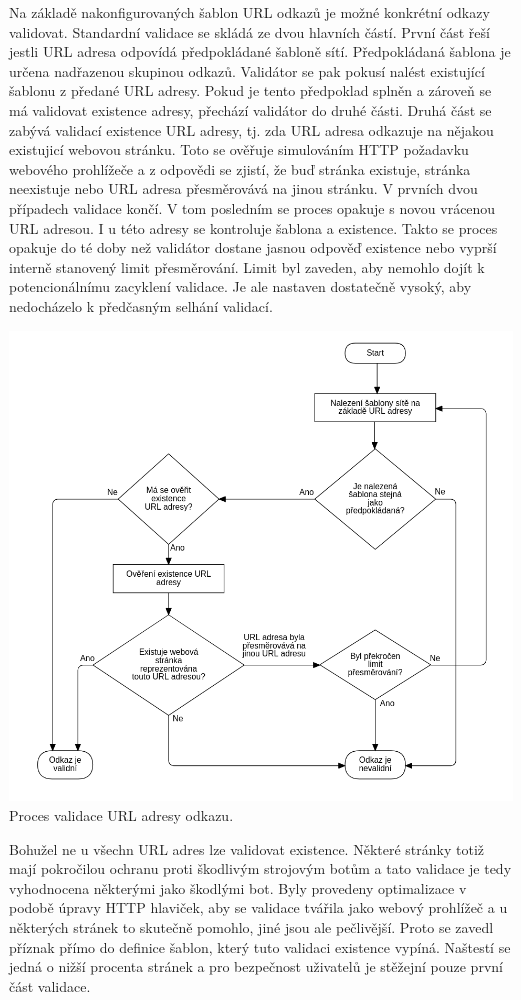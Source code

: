 \begin{itemize}
\begin{itemize}
			Na základě nakonfigurovaných šablon URL odkazů je možné konkrétní odkazy validovat.
			Standardní validace se skládá ze dvou hlavních částí.
			První část řeší jestli \ac{URL} adresa odpovídá předpokládané šabloně sítí.
			Předpokládaná šablona je určena nadřazenou skupinou odkazů.
			Validátor se pak pokusí nalést existující šablonu z předané URL adresy.
			Pokud je tento předpoklad splněn a zároveň se má validovat existence adresy, přechází validátor do druhé části.
			Druhá část se zabývá validací existence \ac{URL} adresy, tj. zda URL adresa odkazuje na nějakou existujicí
			webovou stránku.
			Toto se ověřuje simulováním \ac{HTTP} požadavku webového prohlížeče a z odpovědi se zjistí, že buď stránka
			existuje, stránka neexistuje nebo URL adresa přesměrovává na jinou stránku.
			V prvních dvou případech validace končí.
			V tom posledním se proces opakuje s novou vrácenou URL adresou.
			I u této adresy se kontroluje šablona a existence.
			Takto se proces opakuje do té doby než validátor dostane jasnou odpověď existence nebo vyprší interně stanovený
			limit přesměrování.
			Limit byl zaveden, aby nemohlo dojít k potencionálnímu zacyklení validace.
			Je ale nastaven dostatečně vysoký, aby nedocházelo k předčasným selhání validací.

			\includegraphics{obrazky/proces_validace_odkazu}\hfill
			Proces validace URL adresy odkazu. %

			Bohužel ne u všechn URL adres lze validovat existence.
			Některé stránky totiž mají pokročilou ochranu proti škodlivým strojovým botům a tato validace je tedy
			vyhodnocena některými jako škodlými bot.
			Byly provedeny optimalizace v podobě úpravy \ac{HTTP} hlaviček, aby se validace tvářila jako webový prohlížeč
			a u některých stránek to skutečně pomohlo, jiné jsou ale pečlivější.
			Proto se zavedl příznak přímo do definice šablon, který tuto validaci existence vypíná.
			Naštestí se jedná o nižší procenta stránek a pro bezpečnost uživatelů je stěžejní pouze první část validace.


\end{itemize}
\end{itemize}
